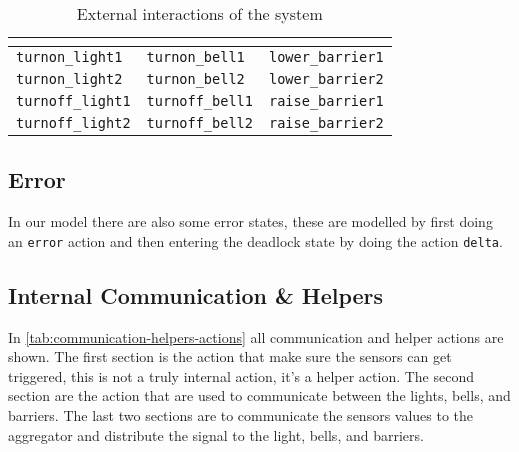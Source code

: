 \documentclass[final]{report}
\begin{document}
\begin{table}[H]
    \centering
    \caption{External interactions of the system}
    \label{tab:external-actions}
    \begin{tabular}{lll}
        \toprule
        \textbf{\nameref{sec:architecture-light-controller}} & \textbf{\nameref{sec:architecture-bell-controller}} & \textbf{\nameref{sec:architecture-barrier-controller}} \\ 
        \midrule
        \texttt{turnon\_light1}                     & \texttt{turnon\_bell1}                     & \texttt{lower\_barrier1} \\
        \texttt{turnon\_light2}                     & \texttt{turnon\_bell2}                     & \texttt{lower\_barrier2} \\
        \texttt{turnoff\_light1}                    & \texttt{turnoff\_bell1}                    & \texttt{raise\_barrier1} \\
        \texttt{turnoff\_light2}                    & \texttt{turnoff\_bell2}                    & \texttt{raise\_barrier2} \\ 
        \bottomrule
    \end{tabular}
    
\end{table}

\subsection{Error}
In our model there are also some error states, these are modelled by first doing an \texttt{error} action and then entering the deadlock state by doing the action \texttt{delta}.


\subsection{Internal Communication \& Helpers}
In \cref{tab:communication-helpers-actions} all communication and helper actions are shown.
The first section is the action that make sure the sensors can get triggered, this is not a truly internal action, it's a helper action.
The second section are the action that are used to communicate between the lights, bells, and barriers.
The last two sections are to communicate the sensors values to the aggregator and distribute the signal to the light, bells, and barriers.
\end{document}
